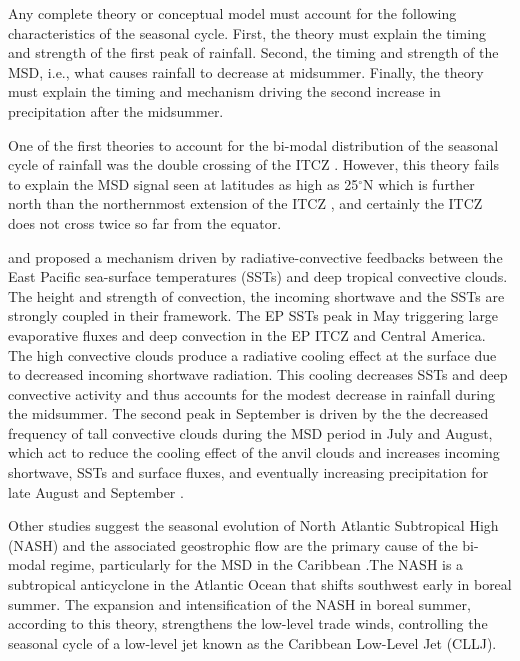Any complete theory or conceptual model must account for the following characteristics of the seasonal cycle. First, the theory must explain the timing and strength of the first peak of rainfall. Second, the timing and strength of the MSD, i.e., what causes rainfall to decrease at midsummer. Finally, the theory must explain the timing and mechanism driving the second increase in precipitation after the midsummer. %

One of the first theories to account for the bi-modal distribution of the seasonal cycle of rainfall was the double crossing of the ITCZ \citep{hastenrath1967}. 
However, this theory fails to explain the MSD signal seen at latitudes as high as 25$^\circ$N \citep{perdigon2018,zhao2020} which is further north than the northernmost extension of the ITCZ \citep{schneider2014}, and certainly the ITCZ does not cross twice so far from the equator. %

\cite{magana1999} and \cite{magana2005} proposed a mechanism driven by radiative-convective feedbacks between the East Pacific sea-surface temperatures (SSTs) and deep tropical convective clouds. The height and strength of convection, the incoming shortwave and the SSTs are strongly coupled in their framework. %
The EP SSTs peak in May triggering large evaporative fluxes and deep convection in the EP ITCZ and Central America.
The high convective clouds produce a radiative cooling effect at the surface due to decreased incoming shortwave radiation.
This cooling  decreases SSTs and deep convective activity and thus accounts for the modest decrease in rainfall during the midsummer.
The second peak in September is driven by the the decreased frequency of tall convective clouds during the MSD period in July and August, which act to reduce the cooling effect of the anvil clouds and increases incoming shortwave, SSTs and surface fluxes, and eventually increasing precipitation for late August and September \citep{magana1999}.



 Other studies suggest the seasonal evolution of North Atlantic Subtropical High (NASH) and the associated geostrophic flow are the primary cause of the bi-modal regime, particularly for the MSD in the Caribbean  \citep[e.g.][]{mapes2005,gamble2008,curtis2008}.The NASH is a subtropical anticyclone in the Atlantic Ocean that shifts southwest early in boreal summer. The expansion and intensification of the NASH in boreal summer, according to this theory, strengthens the low-level trade winds, controlling the seasonal cycle of a low-level jet known as the Caribbean Low-Level Jet (CLLJ). 
 
